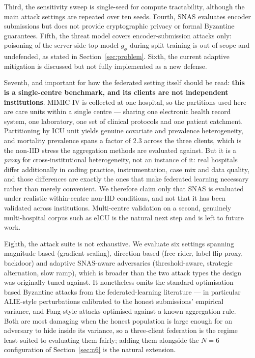 \documentclass[pdflatex,sn-mathphys-num]{sn-jnl}
\begin{document}
Third, the sensitivity sweep is single-seed for compute tractability, although the main attack settings are repeated over ten seeds. Fourth, SNAS evaluates encoder submissions but does not provide cryptographic privacy or formal Byzantine guarantees. Fifth, the threat model covers encoder-submission attacks only: poisoning of the server-side top model $g_\phi$ during split training is out of scope and undefended, as stated in Section~\ref{sec:problem}. Sixth, the current adaptive mitigation is discussed but not fully implemented as a new defense.

Seventh, and important for how the federated setting itself should be read: \textbf{this is a single-centre benchmark, and its clients are not independent institutions}. MIMIC-IV is collected at one hospital, so the partitions used here are care units within a single centre --- sharing one electronic health record system, one laboratory, one set of clinical protocols and one patient catchment. Partitioning by ICU unit yields genuine covariate and prevalence heterogeneity, and mortality prevalence spans a factor of $2.3$ across the three clients, which is the non-IID stress the aggregation methods are evaluated against. But it is a \emph{proxy} for cross-institutional heterogeneity, not an instance of it: real hospitals differ additionally in coding practice, instrumentation, case mix and data quality, and those differences are exactly the ones that make federated learning necessary rather than merely convenient. We therefore claim only that SNAS is evaluated under realistic within-centre non-IID conditions, and not that it has been validated across institutions. Multi-centre validation on a second, genuinely multi-hospital corpus such as eICU is the natural next step and is left to future work.

Eighth, the attack suite is not exhaustive. We evaluate six settings spanning magnitude-based (gradient scaling), direction-based (free rider, label-flip proxy, backdoor) and adaptive SNAS-aware adversaries (threshold-aware, strategic alternation, slow ramp), which is broader than the two attack types the design was originally tuned against. It nonetheless omits the standard optimisation-based Byzantine attacks from the federated-learning literature --- in particular ALIE-style perturbations calibrated to the honest submissions' empirical variance, and Fang-style attacks optimised against a known aggregation rule. Both are most damaging when the honest population is large enough for an adversary to hide inside its variance, so a three-client federation is the regime least suited to evaluating them fairly; adding them alongside the $N=6$ configuration of Section~\ref{sec:n6} is the natural extension.
\end{document}
